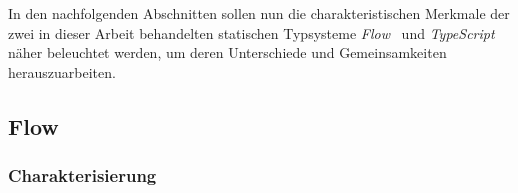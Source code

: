 


In den nachfolgenden Abschnitten sollen nun die charakteristischen Merkmale der zwei in dieser Arbeit behandelten statischen Typsysteme \textit{Flow}~\autocite{FLOW:PAPER} und \textit{TypeScript}~\autocite{TYPESCRIPT:SPEC} näher beleuchtet werden, um deren Unterschiede und Gemeinsamkeiten herauszuarbeiten.

\subsection{Flow}
\label{sec:flow}

\subsubsection{Charakterisierung}


